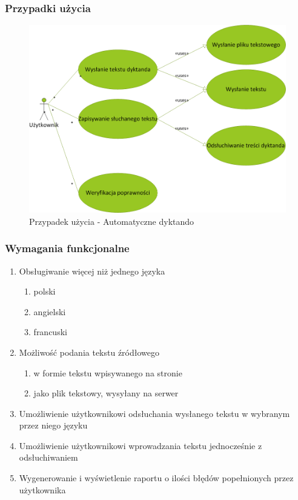 \subsubsection{Przypadki użycia} 
\begin{figure}[!h]
	\centering
	\includegraphics[scale=0.45]{useCaseDictando.png} 
	\caption{Przypadek użycia - Automatyczne dyktando }
\end{figure}

\subsubsection{Wymagania funkcjonalne}
\begin{enumerate}
	\item Obsługiwanie więcej niż jednego języka
		\begin{enumerate}
			\item polski
			\item angielski
			\item francuski
		\end{enumerate}
	\item Możliwość podania tekstu źródłowego
		\begin{enumerate}
			\item w formie tekstu wpisywanego na stronie
			\item jako plik tekstowy, wysyłany na serwer
		\end{enumerate}
	\item Umożliwienie użytkownikowi odsłuchania wysłanego tekstu w wybranym przez niego języku
	\item Umożliwienie użytkownikowi wprowadzania tekstu jednocześnie z odsłuchiwaniem
	\item Wygenerowanie i wyświetlenie raportu o ilości błędów popełnionych przez użytkownika
\end{enumerate}
